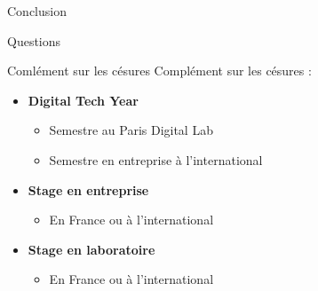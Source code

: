 \documentclass[french]{beamer}
\begin{document}
\begin{frame}{Conclusion}
    \begin{center}
        \huge{Questions}
    \end{center}
\end{frame}

\begin{frame}{Comlément sur les césures}
Complément sur les césures :
\begin{itemize}
    \item \textbf{Digital Tech Year}
    \begin{itemize}
        \item Semestre au Paris Digital Lab
        \item Semestre en entreprise à l'international
    \end{itemize}
    \item \textbf{Stage en entreprise}
    \begin{itemize}
        \item En France ou à l'international
    \end{itemize}
    \item \textbf{Stage en laboratoire}
    \begin{itemize}
        \item En France ou à l'international
    \end{itemize}
\end{itemize}
\end{frame}
\end{document}
